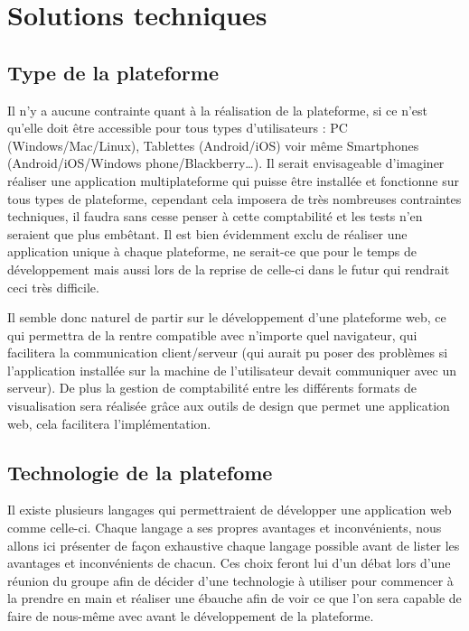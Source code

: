 \section{Solutions techniques}
\label{sec:technique}

    \subsection{Type de la plateforme}
    \label{subsec:plateforme}
    Il n’y a aucune contrainte quant à la réalisation de la plateforme, si ce n’est qu’elle doit être
    accessible pour tous types d’utilisateurs : PC (Windows/Mac/Linux), Tablettes (Android/iOS) voir
    même Smartphones (Android/iOS/Windows phone/Blackberry…). Il serait envisageable d’imaginer réaliser
    une application multiplateforme qui puisse être installée et fonctionne sur tous types de plateforme,
    cependant cela imposera de très nombreuses contraintes techniques, il faudra sans cesse penser à cette
    comptabilité et les tests n’en seraient que plus embêtant. Il est bien évidemment exclu de réaliser
    une application unique à chaque plateforme, ne serait-ce que pour le temps de développement mais aussi
    lors de la reprise de celle-ci dans le futur qui rendrait ceci très difficile.

    Il semble donc naturel de partir sur le développement d’une plateforme web, ce qui permettra
    de la rentre compatible avec n’importe quel navigateur, qui facilitera la communication client/serveur
    (qui aurait pu poser des problèmes si l’application installée sur la machine de l’utilisateur devait communiquer avec un serveur).
    De plus la gestion de comptabilité entre les différents formats de visualisation sera réalisée grâce
    aux outils de design que permet une application web, cela facilitera l’implémentation.

    \subsection{Technologie de la platefome}
    \label{subsec:technologie}
    Il existe plusieurs langages qui permettraient de développer une application web comme celle-ci.
    Chaque langage a ses propres avantages et inconvénients, nous allons ici présenter de façon exhaustive
    chaque langage possible avant de lister les avantages et inconvénients de chacun. Ces choix feront lui
    d’un débat lors d’une réunion du groupe afin de décider d’une technologie à utiliser pour commencer à la
    prendre en main et réaliser une ébauche afin de voir ce que l’on sera capable de faire de nous-même avec
    avant le développement de la plateforme.

